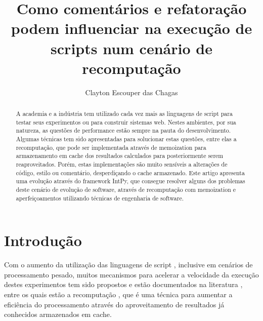 \documentclass[sigconf]{acmart}
\begin{document}
\title{Como comentários e refatoração podem influenciar na execução de scripts num cenário de recomputação}

\author{Clayton Escouper das Chagas}

\renewcommand{\shortauthors}{Clayton Escouper das Chagas}

\begin{abstract}
A academia e a indústria tem utilizado cada vez mais as linguagens de script para testar seus experimentos ou para construir sistemas web. Nestes ambientes, por sua natureza, as questões de performance estão sempre na pauta do desenvolvimento. Algumas técnicas tem sido apresentadas para solucionar estas questões, entre elas a recomputação, que pode ser implementada através de memoization para armazenamento em cache dos resultados calculados para posteriormente serem reaproveitados. Porém, estas implementações são muito sensíveis a alterações de código, estilo ou comentário, desperdiçando o cache armazenado. Este artigo apresenta uma evolução através do framework IntPy, que consegue resolver alguns dos problemas deste cenário de evolução de software, através de recomputação com memoization e aperfeiçoamentos utilizando técnicas de engenharia de software.
\end{abstract}


\maketitle

\section{Introdução}
Com o aumento da utilização das linguagens de script \cite{IEEESpectrum:2020}, inclusive em cenários de processamento pesado, muitos mecanismos para acelerar a velocidade da execução destes experimentos tem sido propostos e estão documentados na literatura \cite{nguyen2013cachetor}\cite{della2015performance}\cite{fitzpatrick2004distributed}, entre os quais estão a recomputação \cite{missier2019efficient}, que é uma técnica para aumentar a eficiência do processamento através do aproveitamento de resultados já conhecidos armazenados em cache.
\end{document}
